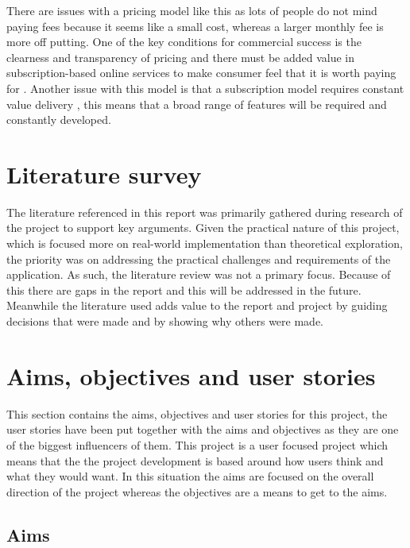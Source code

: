 \documentclass[]{project_report}
\begin{document}
There are issues with a pricing model like this as lots of people do not mind paying fees because it seems like a small cost, whereas a larger monthly fee is more off putting. One of the key conditions for commercial success is the clearness and transparency of pricing \cite{saas_architecture_pricing} and there must be added value in subscription-based online services to make consumer feel that it is worth paying for \cite{fee_based_services}. Another issue with this model is that a subscription model requires constant value delivery \cite{license_vs_subscription_pricing}, this means that a broad range of features will be required and constantly developed.

\section{Literature survey} 

The literature referenced in this report was primarily gathered during research of the project to support key arguments. Given the practical nature of this project, which is focused more on real-world implementation than theoretical exploration, the priority was on addressing the practical challenges and requirements of the application. As such, the literature review was not a primary focus. Because of this there are gaps in the report and this will be addressed in the future. Meanwhile the literature used adds value to the report and project by guiding decisions that were made and by showing why others were made.


\section{Aims, objectives and user stories}

This section contains the aims, objectives and user stories for this project, the user stories have been put together with the aims and objectives as they are one of the biggest influencers of them. This project is a user focused project which means that the the project development is based around how users think and what they would want. In this situation the aims are focused on the overall direction of the project whereas the objectives are a means to get to the aims.

\subsection{Aims}
\end{document}
